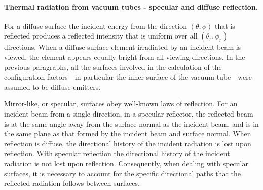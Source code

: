 \paragraph{Thermal radiation from vacuum tubes - specular and diffuse reflection.\newline}

For a diffuse surface the incident energy from the direction $(\theta, \phi)$ that is reflected produces a reflected intensity that is uniform over all $(\theta_r, \phi_r)$ directions. When a diffuse surface element irradiated by an incident beam is viewed, the element appears equally bright from all viewing directions.  In the previous paragraphs, all the surfaces involved in the calculation of the configuration factors---in particular the inner surface of the vacuum tube---were assumed to be diffuse emitters.

Mirror-like, or specular, surfaces obey well-known laws of reflection. For an incident beam from a single direction, in a specular reflector, the reflected beam is at the same angle away from the surface normal as the incident beam, and is in the same plane as that formed by the incident beam and surface normal. When reflection is diffuse, the directional history of the incident radiation is lost upon reflection. With specular reflection the directional history of the incident radiation is not lost upon reflection. Consequently, when dealing with specular surfaces, it is necessary to account for the specific directional paths that the reflected radiation follows between surfaces.

